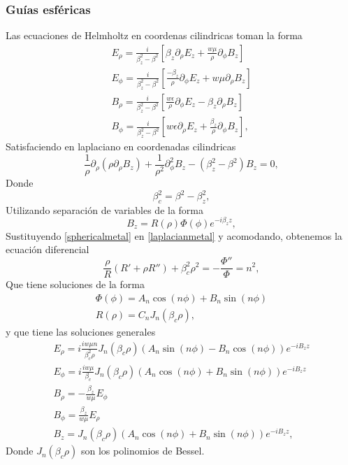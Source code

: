 \subsubsection{Guías esféricas}
Las ecuaciones de Helmholtz en coordenas cilindricas toman la forma
\begin{eqnarray}
	E_{\rho}=\frac{i}{\beta^2_{z}-\beta^2} \left[ \beta_{z} \partial_{\rho} E_{z}+ \frac{w \mu}{\rho}\partial_{\phi}B_{z} \right] \\
		E_{\phi}=\frac{i}{\beta^2_{z}-\beta^2} \left[ \frac{-\beta_{z}}{\rho} \partial_{\phi} E_{z}+ w \mu\partial_{\rho}B_{z} \right] \\
B_{\rho}=\frac{i}{\beta^2_{z}-\beta^2} \left[ \frac{w \epsilon}{\rho} \partial_{\phi} E_{z}- \beta_{z} \partial_{\rho}B_{z} \right] \\
B_{\phi}=\frac{i}{\beta^2_{z}-\beta^2} \left[ w \epsilon \partial_{\rho} E_{z}+ \frac{\beta_{z}}{\rho} \partial_{\phi}B_{z} \right] 	,
\end{eqnarray}
Satisfaciendo en laplaciano en coordenadas cilindricas
\begin{equation}\label{laplacianmetal}
\frac{1}{\rho}\partial_{\rho}(\rho \partial_{\rho} B_{z}) + \frac{1}{\rho^2} \partial_{\phi}^2 B_{z}-(\beta_{z}^2-\beta^2)B_{z}=0,
\end{equation}
Donde
\begin{equation}
	\beta_{c}^2=\beta^2-\beta_{z}^2,
\end{equation}
Utilizando separación de variables de la forma
\begin{equation}\label{sphericalmetal}
B_{z}=R(\rho)\Phi(\phi)e^{-i\beta_{z}z},
\end{equation}
Sustituyendo \ref{sphericalmetal} en \ref{laplacianmetal} y acomodando, obtenemos la ecuación diferencial
\begin{equation}
\frac{\rho}{R}(R'+\rho R'')+\beta_{c}^2\rho^2=-\frac{\Phi''}{\Phi}=n^2,
\end{equation} 
Que tiene soluciones de la forma
\begin{eqnarray}
\Phi(\phi)=A_{n}\cos(n\phi)+B_{n}\sin(n\phi) \\
R(\rho)=C_{n}J_{n}(\beta_{c}\rho),
\end{eqnarray}
y que tiene las soluciones generales
\begin{eqnarray}
	E_{\rho}=i\frac{i w \mu n}{\beta_{c}^2\rho}J_{n}(\beta_{c}\rho)(A_{n}\sin(n\phi)-B_{n}\cos(n \phi))e^{-iB_{z}z} \\
	E_{\phi}=i\frac{i w \mu }{\beta_{c}}J_{n}(\beta_{c}\rho)(A_{n}\cos(n\phi)+B_{n}\sin(n \phi))e^{-iB_{z}z}\\
	B_{\rho}=-\frac{\beta_{z}}{w\mu}E_{\phi}\\
	B_{\phi}=\frac{\beta_{z}}{w\mu}E_{\rho}\\
	B_{z}=J_{n}(\beta_{c}\rho)(A_{n}\cos(n\phi)+B_{n}\sin(n \phi))e^{-iB_{z}z},
\end{eqnarray}
Donde $J_{n}(\beta_{c}\rho)$ son los polinomios de Bessel.
